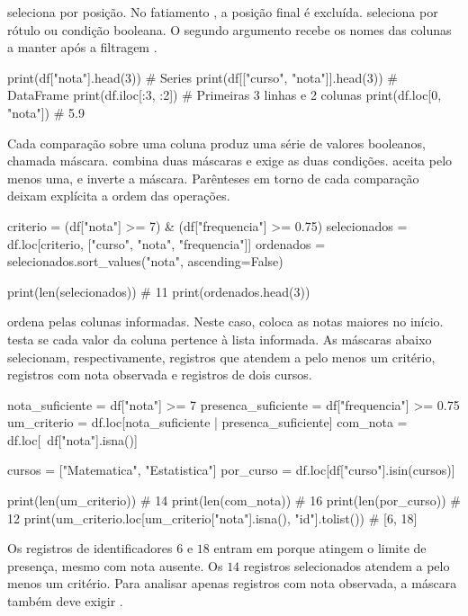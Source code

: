  seleciona por posição. No fatiamento , a posição final é excluída.  seleciona por rótulo ou condição booleana. O segundo argumento recebe os nomes das colunas a manter após a filtragem \cite{pandas}.

\begin{exemplo}
print(df["nota"].head(3))  # Series
print(df[["curso", "nota"]].head(3))  # DataFrame
print(df.iloc[:3, :2])    # Primeiras 3 linhas e 2 colunas
print(df.loc[0, "nota"])  # 5.9
\end{exemplo}

Cada comparação sobre uma coluna produz uma série de valores booleanos, chamada máscara. \codigo{\&} combina duas máscaras e exige as duas condições. \codigo{\textbar} aceita pelo menos uma, e \codigo{\textasciitilde} inverte a máscara. Parênteses em torno de cada comparação deixam explícita a ordem das operações.

\begin{exemplo}
criterio = (df["nota"] >= 7) & (df["frequencia"] >= 0.75)
selecionados = df.loc[criterio, ["curso", "nota", "frequencia"]]
ordenados = selecionados.sort_values("nota", ascending=False)

print(len(selecionados))  # 11
print(ordenados.head(3))
\end{exemplo}

 ordena pelas colunas informadas. Neste caso,  coloca as notas maiores no início.  testa se cada valor da coluna pertence à lista informada. As máscaras abaixo selecionam, respectivamente, registros que atendem a pelo menos um critério, registros com nota observada e registros de dois cursos.

\begin{exemplo}
nota_suficiente = df["nota"] >= 7
presenca_suficiente = df["frequencia"] >= 0.75
um_criterio = df.loc[nota_suficiente | presenca_suficiente]
com_nota = df.loc[~df["nota"].isna()]

cursos = ["Matematica", "Estatistica"]
por_curso = df.loc[df["curso"].isin(cursos)]

print(len(um_criterio))  # 14
print(len(com_nota))    # 16
print(len(por_curso))   # 12
print(um_criterio.loc[um_criterio["nota"].isna(), "id"].tolist())
# [6, 18]
\end{exemplo}

Os registros de identificadores \(6\) e \(18\) entram em  porque atingem o limite de presença, mesmo com nota ausente. Os \(14\) registros selecionados atendem a pelo menos um critério. Para analisar apenas registros com nota observada, a máscara também deve exigir .


